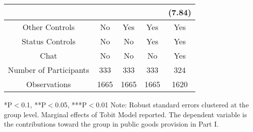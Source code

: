 \begin{table}[htbp]
\begin{tabular}{c c c c c}
                                 &                     &                     &                    &  (7.84)  \\
\midrule
Other Controls                   &    No               &    Yes              &    Yes             &    Yes        \\
Status Controls                    &    No               &    No               &    Yes             &    Yes        \\
Chat                             &    No               &    No               &    No              &    Yes        \\
\midrule
Number of Participants           &    333               &    333              &    333             &    324        \\
\midrule
Observations                     &       1665          &       1665          &  1665              &  1620    \\
\bottomrule

\end{tabular}
\begin{footnotesize}
\newline
*P$<$0.1, **P$<$0.05, ***P$<$0.01
\newline
Note: Robust standard errors clustered at the group level. Marginal effects of Tobit Model reported. 
\newline
The dependent variable is the contributions toward the group in public goods provision in Part I. \end{footnotesize}
\end{table}